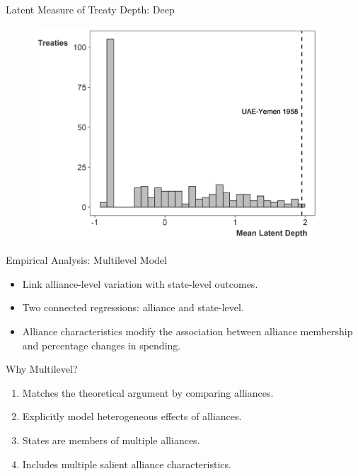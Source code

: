 \documentclass[12pt]{beamer}
\begin{document}

\begin{frame}{Latent Measure of Treaty Depth: Deep}

\begin{figure}[htbp]
	\centering
		\includegraphics[width=0.95\textwidth]{ld-hist-deep.png}
\end{figure}


\end{frame} 



\begin{frame}{Empirical Analysis: Multilevel Model}

\begin{itemize} 
\item Link alliance-level variation with state-level outcomes. 
\pause
\item Two connected regressions: alliance and state-level. 
\pause 
\item Alliance characteristics modify the association between alliance membership and percentage changes in spending.  
\end{itemize} 

\end{frame} 



\begin{frame}{Why Multilevel?}

\begin{enumerate} 
\item Matches the theoretical argument by comparing alliances. 
\pause
\item Explicitly model heterogeneous effects of alliances.
\pause
\item States are members of multiple alliances.  
\pause 
\item Includes multiple salient alliance characteristics. 
\end{enumerate} 

\end{frame} 
\end{document}

